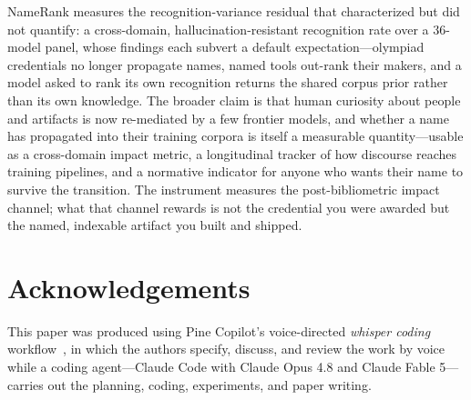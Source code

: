 \documentclass[11pt]{article}
\begin{document}
NameRank measures the recognition-variance residual that \citet{li2026ikp} characterized but did not quantify: a cross-domain, hallucination-resistant recognition rate over a $36$-model panel, whose findings each subvert a default expectation---olympiad credentials no longer propagate names, named tools out-rank their makers, and a model asked to rank its own recognition returns the shared corpus prior rather than its own knowledge. The broader claim is that human curiosity about people and artifacts is now re-mediated by a few frontier models, and whether a name has propagated into their training corpora is itself a measurable quantity---usable as a cross-domain impact metric, a longitudinal tracker of how discourse reaches training pipelines, and a normative indicator for anyone who wants their name to survive the transition. The instrument measures the post-bibliometric impact channel; what that channel rewards is not the credential you were awarded but the named, indexable artifact you built and shipped.

\section*{Acknowledgements}

This paper was produced using Pine Copilot's voice-directed \emph{whisper coding} workflow~\citep{pineai2026whispercoding}, in which the authors specify, discuss, and review the work by voice while a coding agent---Claude Code with Claude Opus 4.8 and Claude Fable 5---carries out the planning, coding, experiments, and paper writing.




\clearpage
\appendix

\end{document}
